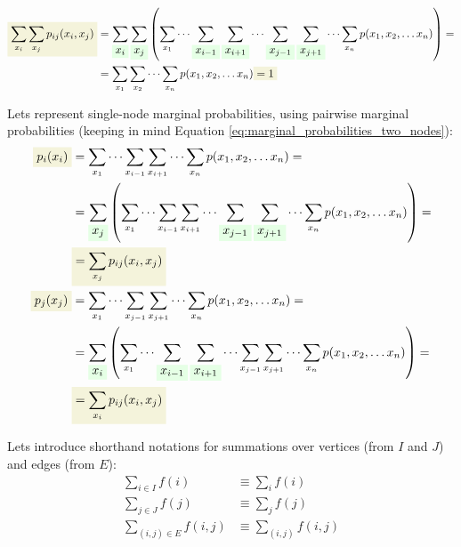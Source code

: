 \documentclass[fleqn,leqno]{article}
\newcommand{\highlight}[1]{\colorbox{green!10}{$\displaystyle#1$}}
\newcommand{\highlightred}[1]{\colorbox{olive!10}{$\displaystyle#1$}}
\begin{document}
\begin{equation} \label{eq:sum_over_states_of_two_node_marginal_probabilities}
\begin{split}
\highlightred{ \sum_{x_i} \sum_{x_j} p_{ij}(x_i, x_j) } & = \sum_{ \highlight{ x_i } } \sum_{ \highlight{ x_j } } \left( \sum_{x_1} \cdots \sum_{ \highlight{ x_{i - 1} } } \sum_{ \highlight{ x_{i + 1} } } \cdots \sum_{ \highlight{ x_{j - 1} } } \sum_{ \highlight{ x_{j + 1} } } \cdots \sum_{x_n} p(x_1, x_2, \dots x_n) \right) = \\
                                                           & = \sum_{x_1} \sum_{x_2} \cdots \sum_{x_n}  p(x_1, x_2, \dots x_n) \highlightred{ = 1 } \\
\end{split}
\end{equation}

Lets represent single-node marginal probabilities, using pairwise marginal probabilities (keeping in mind Equation \eqref{eq:marginal_probabilities_two_nodes}):
\begin{equation} \label{eq:one_node_marginal_probabilities_from_two_node_marginal_probabilities}
\begin{split}
\highlightred{ p_i(x_i) } & = \sum_{x_1} \cdots \sum_{ x_{i - 1} } \sum_{ x_{i + 1} } \cdots \sum_{x_n} p(x_1, x_2, \dots x_n) = \\
             & = \sum_{\highlight{x_j}} \left( \sum_{x_1} \cdots \sum_{ x_{i - 1} } \sum_{ x_{i + 1} } \cdots \sum_{ \highlight{x_{j - 1}} } \sum_{ \highlight{x_{j + 1}} } \cdots \sum_{x_n} p(x_1, x_2, \dots x_n) \right) = \\
             & \highlightred{ = \sum_{x_j} p_{ij}(x_i, x_j) } \\
\highlightred{ p_j(x_j) } & = \sum_{x_1} \cdots \sum_{ x_{j - 1} } \sum_{ x_{j + 1} } \cdots \sum_{x_n} p(x_1, x_2, \dots x_n) = \\
             & = \sum_{\highlight{x_i}} \left( \sum_{x_1} \cdots \sum_{ \highlight{x_{i - 1}} } \sum_{ \highlight{x_{i + 1}} } \cdots \sum_{ x_{j - 1} } \sum_{ x_{j + 1} } \cdots \sum_{x_n} p(x_1, x_2, \dots x_n) \right) = \\
             & \highlightred{ = \sum_{x_i} p_{ij}(x_i, x_j) }
\end{split}
\end{equation}

Lets introduce shorthand notations for summations over vertices (from $I$ and $J$) and edges (from $E$):
\begin{equation}
\begin{split}
   \sum_{i \in I} f(i)         & \equiv \sum_i f(i) \\
   \sum_{j \in J} f(j)        & \equiv \sum_j f(j) \\
   \sum_{(i, j) \in E} f(i,j)  & \equiv \sum_{(i,j)} f(i, j)
\end{split}
\end{equation}
\end{document}
